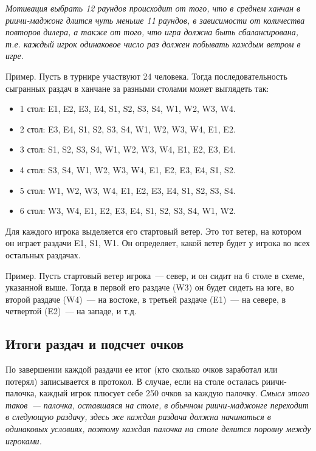 \begin{additional}
\vspace{0.3cm}

\textit{Мотивация выбрать 12 раундов происходит от того, что в среднем ханчан в риичи-маджонг длится чуть меньше 11 раундов, в зависимости от количества повторов дилера, а также от того, что игра должна быть сбалансирована, т.е. каждый игрок одинаковое число раз должен побывать каждым ветром в игре.}

\vspace{0.3cm}

Пример. Пусть в турнире участвуют 24 человека. Тогда последовательность сыгранных раздач в ханчане за разными столами может выглядеть так:

\begin{itemize}
	\item 1 стол: E1, E2, E3, E4, S1, S2, S3, S4, W1, W2, W3, W4.
	\item 2 стол: E3, E4, S1, S2, S3, S4, W1, W2, W3, W4, E1, E2.
	\item 3 стол: S1, S2, S3, S4, W1, W2, W3, W4, E1, E2, E3, E4.
	\item 4 стол: S3, S4, W1, W2, W3, W4, E1, E2, E3, E4, S1, S2.
	\item 5 стол: W1, W2, W3, W4, E1, E2, E3, E4, S1, S2, S3, S4.
	\item 6 стол: W3, W4, E1, E2, E3, E4, S1, S2, S3, S4, W1, W2.
\end{itemize}

\vspace{0.3cm}

Для каждого игрока выделяется его стартовый ветер. Это тот ветер, на котором он играет раздачи E1, S1, W1. Он определяет, какой ветер будет у игрока во всех остальных раздачах.

\vspace{0.3cm}

Пример. Пусть стартовый ветер игрока~--- север, и он сидит на 6 столе в схеме, указанной выше. Тогда в первой его раздаче (W3) он будет сидеть на юге, во второй раздаче (W4)~--- на востоке, в третьей раздаче (E1)~--- на севере, в четвертой (E2)~--- на западе, и т.д.

\subsection{Итоги раздач и подсчет очков}

По завершении каждой раздачи ее итог (кто сколько очков заработал или потерял) записывается в протокол. В случае, если на столе осталась риичи-палочка, каждый игрок плюсует себе 250 очков за каждую палочку. \textit{Смысл этого таков~--- палочка, оставшаяся на столе, в обычном риичи-маджонге переходит в следующую раздачу, здесь же каждая раздача должна начинаться в одинаковых условиях, поэтому каждая палочка на столе делится поровну между игроками.}


\end{additional}
